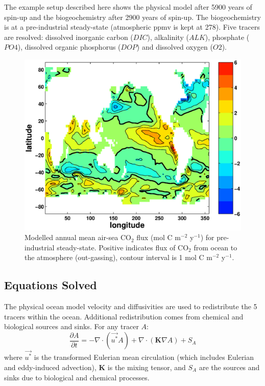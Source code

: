 The example setup described here shows the physical model after 5900
years of spin-up and the biogeochemistry after 2900 years of spin-up.
The biogeochemistry is at a pre-industrial steady-state (atmospheric
ppmv is kept at 278). Five tracers are resolved: dissolved inorganic
carbon ($DIC$), alkalinity ($ALK$), phosphate ($PO4$), dissolved
organic phosphorus ($DOP$) and dissolved oxygen ($O2$).

\begin{figure} [tpb]
\begin{center}
\includegraphics[width=\textwidth,height=.3\textheight]{s_examples/global_oce_biogeo/co2flux.eps}
\caption{Modelled annual  mean air-sea CO$_2$ flux (mol C m$^{-2}$ y$^{-1}$)
for pre-industrial steady-state. Positive indicates  flux of CO$_2$
from ocean to the atmosphere (out-gassing),
contour interval is 1 mol C m$^{-2}$ y$^{-1}$.}
\label{lFcarflux}
\end{center}
\end{figure}


\subsection{Equations Solved}

The physical ocean model velocity and diffusivities are used to
redistribute the 5 tracers within the ocean. Additional redistribution
comes from chemical and biological sources and sinks.  For any tracer
$A$:
\begin{equation}
  \frac{\partial A}{\partial t}=-\nabla \cdot (\vec{u^{*}} A)+\nabla \cdot
  (\mathbf{K}\nabla A)+S_A \nonumber \label{lEtrac}
\end{equation}
where $\vec{u^{*}}$ is the transformed Eulerian mean circulation
(which includes Eulerian and eddy-induced advection), $\mathbf{K}$ is
the mixing tensor, and $S_A$ are the sources and sinks due to
biological and chemical processes.


